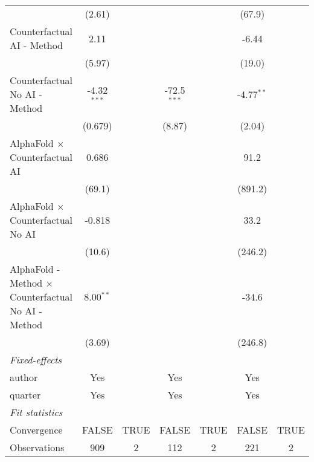 \begin{tabular}{lcccccc}
                                                              & (2.61)        &      &                &      & (67.9)       &   \\   
   Counterfactual AI - Method                                 & 2.11          &      &                &      & -6.44        &   \\   
                                                              & (5.97)        &      &                &      & (19.0)       &   \\   
   Counterfactual No AI - Method                              & -4.32$^{***}$ &      & -72.5$^{***}$  &      & -4.77$^{**}$ &   \\   
                                                              & (0.679)       &      & (8.87)         &      & (2.04)       &   \\   
   AlphaFold $\times$ Counterfactual AI                       & 0.686         &      &                &      & 91.2         &   \\   
                                                              & (69.1)        &      &                &      & (891.2)      &   \\   
   AlphaFold $\times$ Counterfactual No AI                    & -0.818        &      &                &      & 33.2         &   \\   
                                                              & (10.6)        &      &                &      & (246.2)      &   \\   
   AlphaFold - Method $\times$ Counterfactual No AI - Method  & 8.00$^{**}$   &      &                &      & -34.6        &   \\   
                                                              & (3.69)        &      &                &      & (246.8)      &   \\   
   \midrule
   \emph{Fixed-effects}\\
   author                                                     & Yes           &      & Yes            &      & Yes          & \\  
   quarter                                                    & Yes           &      & Yes            &      & Yes          & \\  
   \midrule
   \emph{Fit statistics}\\
   Convergence                                                &FALSE          & TRUE & FALSE          & TRUE & FALSE        & TRUE\\  
   Observations                                               & 909           & 2    & 112            & 2    & 221          & 2\\  

\end{tabular}
